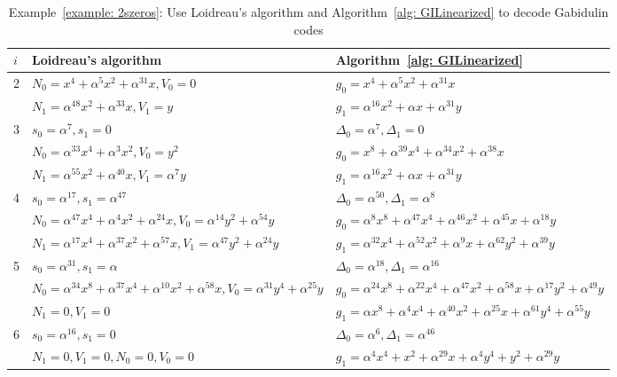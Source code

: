 \documentclass[11pt,onecolumn,draftcls]{IEEEtran}
\begin{document}
\begin{table*}[htbp]
\begin{center}
\caption{Example~\ref{example: 2szeros}: Use Loidreau's algorithm and Algorithm~\ref{alg: GILinearized} to decode Gabidulin codes}
\label{tab: LdvsGI}
\begin{tabular}{|l|l|l|}
\hline
$i$  &  Loidreau's algorithm   &  Algorithm~\ref{alg: GILinearized} \\ \hline
\multirow{2}{*}{2} & $N_0 = x^4 + \alpha^5 x^2 + \alpha^{31} x, V_0 = 0$ & $g_0 = x^4 + \alpha^5 x^2 + \alpha^{31} x$ \\
    & $N_1 = \alpha^{48}x^2 + \alpha^{33} x, V_1 = y$ & $g_1 = \alpha^{16} x^2 + \alpha x + \alpha^{31} y$ \\ \hline

\multirow{3}{*}{3} & $s_0 = \alpha^7, s_1 = 0$ & $\Delta_0 = \alpha^7, \Delta_1 = 0$ \\		
		& $N_0 = \alpha^{33}x^4 + \alpha^3 x^2, V_0 = y^2$ & $g_0 = x^8 + \alpha^{39} x^4 + \alpha^{34} x^2 + \alpha^{38} x$ \\
    & $N_1 = \alpha^{55} x^2 + \alpha^{40} x, V_1 = \alpha^7 y$ & $g_1 = \alpha^{16} x^2 + \alpha x + \alpha^{31} y$ \\ \hline

\multirow{3}{*}{4} & $s_0 = \alpha^{17}, s_1 = \alpha^{47}$ & $\Delta_0 = \alpha^{50}, \Delta_1 = \alpha^8$ \\		
		& $N_0 = \alpha^{47}x^4 + \alpha^4 x^2 + \alpha^{24} x, V_0 = \alpha^{14} y^2 + \alpha^{54} y$ & $g_0 = \alpha^8 x^8 + \alpha^{47} x^4 + \alpha^{46} x^2 + \alpha^{45} x + \alpha^{18} y$ \\
    & $N_1 = \alpha^{17} x^4 + \alpha^{37} x^2 + \alpha^{57} x, V_1 = \alpha^{47} y^2 + \alpha ^{24} y$ & $g_1 = \alpha^{32} x^4 + \alpha^{52} x^2 + \alpha^9 x + \alpha^{62} y^2 + \alpha^{39} y$ \\ \hline

\multirow{3}{*}{5} & $s_0 = \alpha^{31}, s_1 = \alpha$ & $\Delta_0 = \alpha^{18}, \Delta_1 = \alpha^{16}$ \\		
		& $N_0 = \alpha^{34}x^8 + \alpha^{37} x^4 + \alpha^{10} x^2 + \alpha^{58} x, V_0 = \alpha^{31} y^4 + \alpha^{25} y$ & $g_0 = \alpha^{24} x^8 + \alpha^{22} x^4 + \alpha^{47} x^2 + \alpha^{58} x + \alpha^{17} y^2 + \alpha^{49} y$ \\
    & $N_1 = 0, V_1 = 0$ & $g_1 = \alpha x^8 + \alpha^4 x^4 + \alpha^{40} x^2 + \alpha^{25} x + \alpha^{61} y^4 + \alpha^{55} y$ \\ \hline

\multirow{2}{*}{6} & $s_0 = \alpha^{16}, s_1 = 0$ & $\Delta_0 = \alpha^{6}, \Delta_1 = \alpha^{46}$ \\		
		& $N_1 = 0, V_1 = 0, N_0 = 0, V_0 = 0$ & $g_1 = \alpha^4 x^4 + x^2 + \alpha^{29} x + \alpha^{4} y^4 + y^2 + \alpha^{29} y$ \\ \hline
\end{tabular}
\end{center}
\end{table*}
\end{document}
